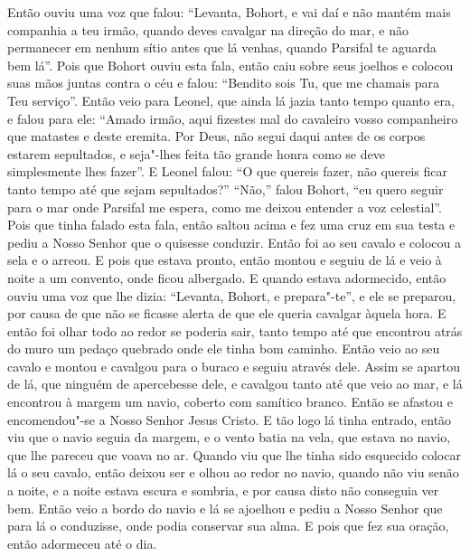 Então ouviu uma voz que falou: “Levanta, Bohort, e vai daí e não mantém mais
companhia a teu irmão, quando deves cavalgar na direção do mar, e não
permanecer em nenhum sítio antes que lá venhas, quando Parsifal te aguarda bem
lá”. Pois que Bohort ouviu esta fala, então caiu sobre seus joelhos e
colocou suas mãos juntas contra o céu e falou: “Bendito sois Tu, que me chamais
para Teu serviço”. Então veio para Leonel, que ainda lá jazia tanto tempo
quanto era, e falou para ele: “Amado irmão, aqui fizestes mal do cavaleiro
vosso companheiro que matastes e deste eremita. Por Deus, não segui daqui antes
de os corpos estarem sepultados, e seja"-lhes feita tão grande honra como se deve
simplesmente lhes fazer”. E Leonel falou: “O que quereis fazer, não quereis
ficar tanto tempo até que sejam sepultados?” “Não,” falou Bohort, “eu quero
seguir para o mar onde Parsifal me espera, como me deixou entender a voz
celestial”. Pois que tinha falado esta fala, então saltou acima e fez uma cruz
em sua testa e pediu a Nosso Senhor que o quisesse conduzir. Então foi ao seu
cavalo e colocou a sela e o arreou. E pois que estava pronto, então montou e
seguiu de lá e veio à noite a um convento, onde ficou albergado. E quando
estava adormecido, então ouviu uma voz que lhe dizia: “Levanta, Bohort, e
prepara"-te”,  e ele se preparou, por causa de que não se ficasse alerta
de que ele queria cavalgar àquela hora. E então foi olhar todo ao redor se
poderia sair, tanto tempo até que encontrou atrás do muro um pedaço quebrado
onde ele tinha bom caminho. Então veio ao seu cavalo e montou e cavalgou para o
buraco e seguiu através dele. Assim se apartou de lá, que ninguém de
apercebesse dele, e cavalgou tanto até que veio ao mar, e lá encontrou à margem
um navio, coberto com samítico branco. Então se afastou e encomendou"-se a Nosso
Senhor Jesus Cristo. E tão logo lá tinha entrado, então viu que o navio seguia
da margem, e o vento batia na vela, que estava no navio, que lhe pareceu que
voava no ar. Quando viu que lhe tinha sido esquecido colocar lá o seu cavalo,
então deixou ser e olhou ao redor no navio, quando não viu senão a noite, e a
noite estava escura e sombria, e por causa disto não conseguia ver bem. Então
veio a bordo do navio e lá se ajoelhou e pediu a Nosso Senhor que para lá o
conduzisse, onde podia conservar sua alma. E pois que fez sua oração, então
adormeceu até o dia.

